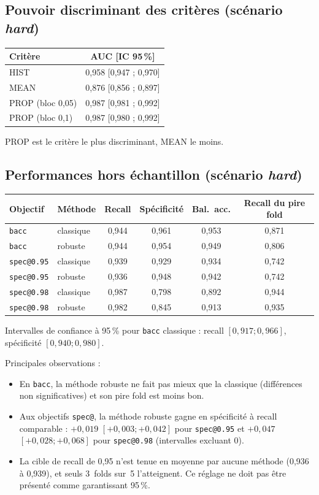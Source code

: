 \documentclass[11pt,a4paper]{article}
\begin{document}
	\subsection{Pouvoir discriminant des critères (scénario \textit{hard})}
	\begin{center}
		\begin{tabular}{lc}
			\toprule
			Critère & AUC [IC 95\,\%] \\
			\midrule
			HIST & 0,958 [0,947 ; 0,970] \\
			MEAN & 0,876 [0,856 ; 0,897] \\
			PROP (bloc 0,05) & 0,987 [0,981 ; 0,992] \\
			PROP (bloc 0,1) & 0,987 [0,980 ; 0,992] \\
			\bottomrule
		\end{tabular}
	\end{center}
	PROP est le critère le plus discriminant, MEAN le moins.
	
	\subsection{Performances hors échantillon (scénario \textit{hard})}
	\begin{center}
		\small
		\begin{tabular}{llcccc}
			\toprule
			Objectif & Méthode & Recall & Spécificité & Bal.\ acc. & Recall du pire fold \\
			\midrule
			\texttt{bacc} & classique & 0,944 & 0,961 & 0,953 & 0,871 \\
			\texttt{bacc} & robuste   & 0,944 & 0,954 & 0,949 & 0,806 \\
			\addlinespace
			\texttt{spec@0.95} & classique & 0,939 & 0,929 & 0,934 & 0,742 \\
			\texttt{spec@0.95} & robuste   & 0,936 & 0,948 & 0,942 & 0,742 \\
			\addlinespace
			\texttt{spec@0.98} & classique & 0,987 & 0,798 & 0,892 & 0,944 \\
			\texttt{spec@0.98} & robuste   & 0,982 & 0,845 & 0,913 & 0,935 \\
			\bottomrule
		\end{tabular}
	\end{center}
	Intervalles de confiance à 95\,\% pour \texttt{bacc} classique : recall $[0{,}917 ; 0{,}966]$, spécificité $[0{,}940 ; 0{,}980]$.
	
	Principales observations :
	\begin{itemize}[nosep]
		\item En \texttt{bacc}, la méthode robuste ne fait pas mieux que la classique (différences non significatives) et son
		pire fold est moins bon.
		\item Aux objectifs \texttt{spec@}, la méthode robuste gagne en spécificité à recall comparable :
		$+0{,}019$ $[+0{,}003 ; +0{,}042]$ pour \texttt{spec@0.95} et $+0{,}047$ $[+0{,}028 ; +0{,}068]$
		pour \texttt{spec@0.98} (intervalles excluant 0).
		\item La cible de recall de 0,95 n'est tenue en moyenne par aucune méthode (0,936 à 0,939), et seuls 3~folds sur~5
		l'atteignent. Ce réglage ne doit pas être présenté comme garantissant 95\,\%.
	\end{itemize}
	
\end{document}
